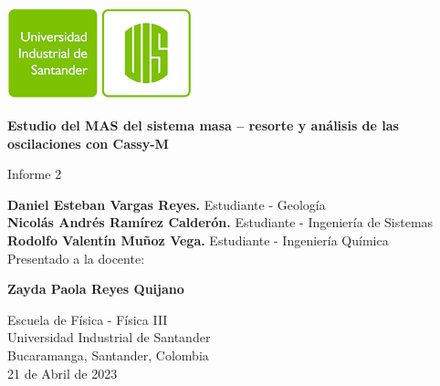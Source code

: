 \begin{titlepage}
    \begin{center}
        \includegraphics[width=0.4\textwidth]{../general-images/uis-logo.png}
        
        \vspace{0.5cm}
        \LARGE
        \textbf{Estudio del MAS del sistema masa – resorte y análisis de las oscilaciones con Cassy-M}
        
        \vspace{0.5cm}
        \large
        Informe 2
        
        \vfill
        
        \textbf{Daniel Esteban Vargas Reyes.} Estudiante - Geología\\
        \textbf{Nicolás Andrés Ramírez Calderón.} Estudiante - Ingeniería de Sistemas\\ 
        \textbf{Rodolfo Valentín Muñoz Vega.} Estudiante - Ingeniería Química\\

        \vspace{1.0cm}
        Presentado a la docente:
        
        \textbf{Zayda Paola Reyes Quijano}
        
        \vfill
        
        Escuela de Física - Física III\\
        Universidad Industrial de Santander\\
        Bucaramanga, Santander, Colombia\\
        21 de Abril de 2023        
    \end{center}
\end{titlepage}
